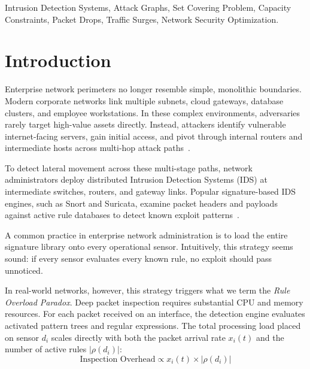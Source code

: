 \documentclass[conference]{IEEEtran}
\begin{document}
\begin{IEEEkeywords}
Intrusion Detection Systems, Attack Graphs, Set Covering Problem, Capacity Constraints, Packet Drops, Traffic Surges, Network Security Optimization.
\end{IEEEkeywords}

\section{Introduction}
\label{sec:intro}

Enterprise network perimeters no longer resemble simple, monolithic boundaries. Modern corporate networks link multiple subnets, cloud gateways, database clusters, and employee workstations. In these complex environments, adversaries rarely target high-value assets directly. Instead, attackers identify vulnerable internet-facing servers, gain initial access, and pivot through internal routers and intermediate hosts across multi-hop attack paths~\cite{huang2022efficient}.

To detect lateral movement across these multi-stage paths, network administrators deploy distributed Intrusion Detection Systems (IDS) at intermediate switches, routers, and gateway links. Popular signature-based IDS engines, such as Snort and Suricata, examine packet headers and payloads against active rule databases to detect known exploit patterns~\cite{roesch1999snort}.

A common practice in enterprise network administration is to load the entire signature library onto every operational sensor. Intuitively, this strategy seems sound: if every sensor evaluates every known rule, no exploit should pass unnoticed.

In real-world networks, however, this strategy triggers what we term the \textit{Rule Overload Paradox}. Deep packet inspection requires substantial CPU and memory resources. For each packet received on an interface, the detection engine evaluates activated pattern trees and regular expressions. The total processing load placed on sensor $d_i$ scales directly with both the packet arrival rate $x_i(t)$ and the number of active rules $|\rho(d_i)|$:
\begin{equation}
\text{Inspection Overhead} \propto x_i(t) \times |\rho(d_i)|
\end{equation}
\end{document}
